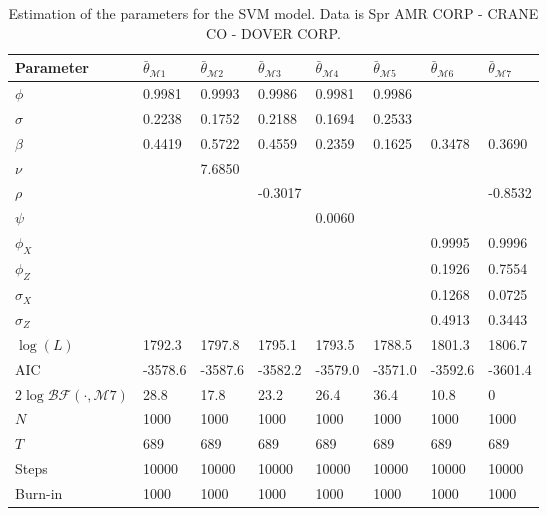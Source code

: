 \documentclass[11pt,a4,twosided,singlespacing,titlepagenumber=on]{scrreprt}
\numberwithin{equation}{chapter} %
\theoremstyle{remark}
\begin{document}
\begin{table}[H]
\centering
\begin{tabular}{llllllll}
\label{estimation_of_svm_appl_spr}
Parameter        & $\bar{\theta}_{\mathcal{M}1}$ & $\bar{\theta}_{\mathcal{M}2}$ & $\bar{\theta}_{\mathcal{M}3}$ & $\bar{\theta}_{\mathcal{M}4}$ & $\bar{\theta}_{\mathcal{M}5}$ & $\bar{\theta}_{\mathcal{M}6}$& $\bar{\theta}_{\mathcal{M}7}$\\ 
\hline
$\phi$								                  & 0.9981  & 0.9993 & 0.9986  & 0.9981  & 0.9986 & \\
$\sigma$                                & 0.2238  & 0.1752 & 0.2188  & 0.1694  & 0.2533 & \\
$\beta$                                 & 0.4419  & 0.5722 & 0.4559  & 0.2359  & 0.1625 & 0.3478 & 0.3690\\
$\nu$                                   &         & 7.6850 &         &         &         &\\
$\rho$                                  &         &        & -0.3017 &         &         & & -0.8532\\
$\psi$                                  &         &        &         & 0.0060  &         & \\
$\phi_X$                                &         &        &         &         &         & 0.9995 & 0.9996\\
$\phi_Z$                                &         &        &         &         &         & 0.1926 & 0.7554\\
$\sigma_X$                              &         &        &         &         &         & 0.1268 & 0.0725\\
$\sigma_Z$                              &         &        &         &         &         & 0.4913 & 0.3443\\
$\log(L)$                               & 1792.3  & 1797.8 & 1795.1  & 1793.5  & 1788.5  & 1801.3 & 1806.7\\
AIC                                     & -3578.6 & -3587.6& -3582.2 & -3579.0 & -3571.0 & -3592.6 & -3601.4\\
$2 \log \mathcal{BF}(\cdot, \mathcal{M}7)$& 28.8    & 17.8      & 23.2    & 26.4    & 36.4    & 10.8 & 0 \\
$N$                                     & 1000    & 1000   & 1000    & 1000    & 1000    & 1000 & 1000\\
$T$                                     & 689     & 689    & 689     & 689     & 689     & 689 & 689\\
Steps                                   & 10000   & 10000  & 10000   & 10000   & 10000   & 10000& 10000\\
Burn-in                                 & 1000    & 1000   & 1000    & 1000    & 1000    & 1000 & 1000\\
\hline
\end{tabular}
\caption{Estimation of the parameters for the SVM model. Data is Spr AMR CORP - CRANE CO - DOVER CORP.}
\end{table}
\end{document}
